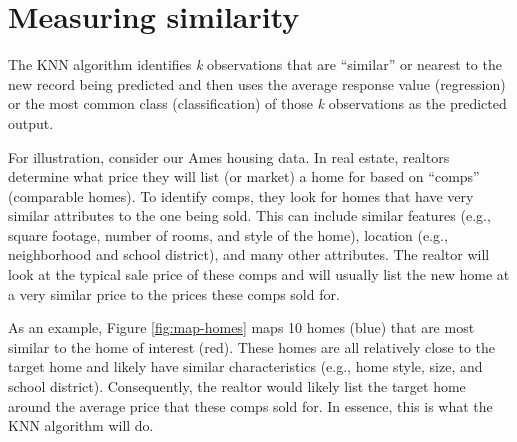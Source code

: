 \documentclass[]{krantz}
\makeatletter
\newenvironment{Shaded}{\begin{snugshade}}{\end{snugshade}}
\newcommand{\CommentTok}[1]{\textcolor[rgb]{0.37,0.37,0.37}{\textit{#1}}}
\newcommand{\DataTypeTok}[1]{\textcolor[rgb]{0.27,0.27,0.27}{#1}}
\newcommand{\DecValTok}[1]{\textcolor[rgb]{0.06,0.06,0.06}{#1}}
\newcommand{\FloatTok}[1]{\textcolor[rgb]{0.06,0.06,0.06}{#1}}
\newcommand{\KeywordTok}[1]{\textcolor[rgb]{0.27,0.27,0.27}{\textbf{#1}}}
\newcommand{\NormalTok}[1]{#1}
\newcommand{\OperatorTok}[1]{\textcolor[rgb]{0.43,0.43,0.43}{\textbf{#1}}}
\newcommand{\OtherTok}[1]{\textcolor[rgb]{0.37,0.37,0.37}{#1}}
\newcommand{\StringTok}[1]{\textcolor[rgb]{0.5,0.5,0.5}{#1}}
\newenvironment{kframe}{%
\medskip{}
\setlength{\fboxsep}{.8em}
 \def\at@end@of@kframe{}%
 \ifinner\ifhmode%
  \def\at@end@of@kframe{\end{minipage}}%
  \begin{minipage}{\columnwidth}%
 \fi\fi%
 \def\FrameCommand##1{\hskip\@totalleftmargin \hskip-\fboxsep
 \colorbox{shadecolor}{##1}\hskip-\fboxsep
     \hskip-\linewidth \hskip-\@totalleftmargin \hskip\columnwidth}%
 \MakeFramed {\advance\hsize-\width
   \@totalleftmargin\z@ \linewidth\hsize
   \@setminipage}}%
 {\par\unskip\endMakeFramed%
 \at@end@of@kframe}
\renewenvironment{Shaded}{\begin{kframe}}{\end{kframe}}
\makeatother
\begin{document}
\begin{Shaded}
\end{Shaded}

\hypertarget{measuring-similarity}{%
\section{Measuring similarity}\label{measuring-similarity}}

The KNN algorithm identifies \emph{k} observations that are ``similar'' or nearest to the new record being predicted and then uses the average response value (regression) or the most common class (classification) of those \emph{k} observations as the predicted output.

For illustration, consider our Ames housing data. In real estate, realtors determine what price they will list (or market) a home for based on ``comps'' (comparable homes). To identify comps, they look for homes that have very similar attributes to the one being sold. This can include similar features (e.g., square footage, number of rooms, and style of the home), location (e.g., neighborhood and school district), and many other attributes. The realtor will look at the typical sale price of these comps and will usually list the new home at a very similar price to the prices these comps sold for.

As an example, Figure \ref{fig:map-homes} maps 10 homes (blue) that are most similar to the home of interest (red). These homes are all relatively close to the target home and likely have similar characteristics (e.g., home style, size, and school district). Consequently, the realtor would likely list the target home around the average price that these comps sold for. In essence, this is what the KNN algorithm will do.
\end{document}

